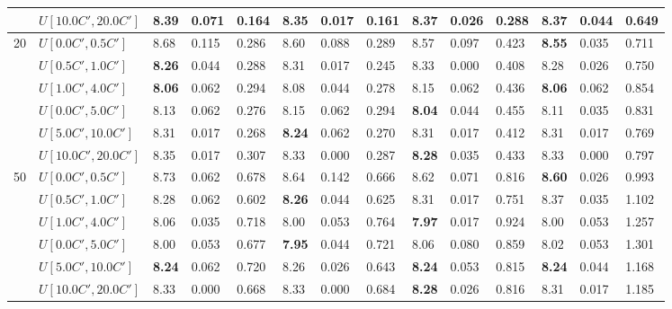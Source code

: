 \begin{table}[h]
{\begin{tabular}{|l|l||l|l|l||l|l|l||l|l|l||l|l|l|}
       & $U[10.0C',20.0C']$ & 8.39 & 0.071 & 0.164 & \textbf{8.35} & 0.017 & 0.161 & 8.37 & 0.026 & 0.288 & 8.37 & 0.044 & 0.649 \\
      \hline\hline
      \multirow{6}{*}{20} & $U[0.0C',0.5C']$ & 8.68 & 0.115 & 0.286 & 8.60 & 0.088 & 0.289 & 8.57 & 0.097 & 0.423 & \textbf{8.55} & 0.035 & 0.711 \\
       & $U[0.5C',1.0C']$ & \textbf{8.26} & 0.044 & 0.288 & 8.31 & 0.017 & 0.245 & 8.33 & 0.000 & 0.408 & 8.28 & 0.026 & 0.750 \\
       & $U[1.0C',4.0C']$ & \textbf{8.06} & 0.062 & 0.294 & 8.08 & 0.044 & 0.278 & 8.15 & 0.062 & 0.436 & \textbf{8.06} & 0.062 & 0.854 \\
       & $U[0.0C',5.0C']$ & 8.13 & 0.062 & 0.276 & 8.15 & 0.062 & 0.294 & \textbf{8.04} & 0.044 & 0.455 & 8.11 & 0.035 & 0.831 \\
       & $U[5.0C',10.0C']$ & 8.31 & 0.017 & 0.268 & \textbf{8.24} & 0.062 & 0.270 & 8.31 & 0.017 & 0.412 & 8.31 & 0.017 & 0.769 \\
       & $U[10.0C',20.0C']$ & 8.35 & 0.017 & 0.307 & 8.33 & 0.000 & 0.287 & \textbf{8.28} & 0.035 & 0.433 & 8.33 & 0.000 & 0.797 \\
      \hline\hline
      \multirow{6}{*}{50} & $U[0.0C',0.5C']$ & 8.73 & 0.062 & 0.678 & 8.64 & 0.142 & 0.666 & 8.62 & 0.071 & 0.816 & \textbf{8.60} & 0.026 & 0.993 \\
       & $U[0.5C',1.0C']$ & 8.28 & 0.062 & 0.602 & \textbf{8.26} & 0.044 & 0.625 & 8.31 & 0.017 & 0.751 & 8.37 & 0.035 & 1.102 \\
       & $U[1.0C',4.0C']$ & 8.06 & 0.035 & 0.718 & 8.00 & 0.053 & 0.764 & \textbf{7.97} & 0.017 & 0.924 & 8.00 & 0.053 & 1.257 \\
       & $U[0.0C',5.0C']$ & 8.00 & 0.053 & 0.677 & \textbf{7.95} & 0.044 & 0.721 & 8.06 & 0.080 & 0.859 & 8.02 & 0.053 & 1.301 \\
       & $U[5.0C',10.0C']$ & \textbf{8.24} & 0.062 & 0.720 & 8.26 & 0.026 & 0.643 & \textbf{8.24} & 0.053 & 0.815 & \textbf{8.24} & 0.044 & 1.168 \\
       & $U[10.0C',20.0C']$ & 8.33 & 0.000 & 0.668 & 8.33 & 0.000 & 0.684 & \textbf{8.28} & 0.026 & 0.816 & 8.31 & 0.017 & 1.185 \\
      \hline
      \end{tabular}
      }
      \label{tab:pcpn90}\end{table}


